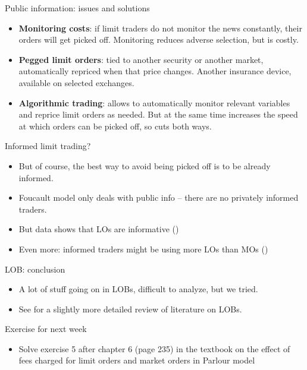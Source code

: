 \documentclass[english,10pt
,aspectratio=169
]{beamer}
\begin{document}
\begin{frame}{Public information: issues and solutions}
	\begin{itemize}[<+->]
		\item \textbf{Monitoring costs}: if limit traders do not monitor the news constantly, their orders will get picked off. Monitoring reduces adverse selection, but is costly.
		\item \textbf{Pegged limit orders}: tied to another security or another market, automatically repriced when that price changes. Another insurance device, available on selected exchanges.
		\item \textbf{Algorithmic trading}: allows to automatically monitor relevant variables and reprice limit orders as needed. But at the same time increases the speed at which orders can be picked off, so cuts both ways.
	\end{itemize}
\end{frame}


\begin{frame}{Informed limit trading?}
	\begin{itemize}
		\item But of course, the best way to avoid being picked off is to be already informed.
		\item Foucault model only deals with public info -- there are no privately informed traders.
		\item But data shows that LOs are informative (\citet*{biais_empirical_1995,beber_order_2005,cao_information_2009})
		\item Even more: informed traders might be using more LOs than MOs (\cite{kaniel_so_2006})
	\end{itemize}
\end{frame}


\begin{frame}{LOB: conclusion}
	\begin{itemize}
		\item A lot of stuff going on in LOBs, difficult to analyze, but we tried.
		\item See \cite{parlour_limit_2008} for a slightly more detailed review of literature on LOBs.
	\end{itemize}
\end{frame}




\begin{frame}{Exercise for next week}
	\begin{itemize}
		\item Solve exercise 5 after chapter 6 (page 235) in the textbook on the effect of fees charged for limit orders and market orders in Parlour model
	\end{itemize}
\end{frame}
\end{document}
